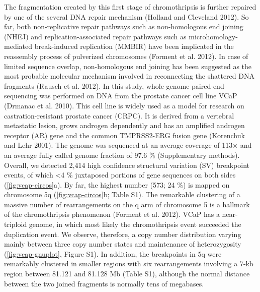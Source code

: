 The fragmentation created by this first stage of chromothripsis is further repaired by one of the several DNA repair mechanism (Holland and Cleveland 2012). So far, both non-replicative repair pathways such as non-homologous end joining (NHEJ) and replication-associated repair pathways such as microhomology-mediated break-induced replication (MMBIR) have been implicated in the reassembly process of pulverized chromosomes (Forment et al. 2012). In case of limited sequence overlap, non-homologous end joining has been suggested as the most probable molecular mechanism involved in reconnecting the shattered DNA fragments (Rausch et al. 2012).
In this study, whole genome paired-end sequencing was performed on DNA from the prostate cancer cell line VCaP (Drmanac et al. 2010). This cell line is widely used as a model for research on castration-resistant prostate cancer (CRPC). It is derived from a vertebral metastatic lesion, grows androgen dependently and has an amplified androgen receptor (AR) gene and the common TMPRSS2-ERG fusion gene (Korenchuk and Lehr 2001). The genome was sequenced at an average coverage of 113× and an average fully called genome fraction of 97.6 \% (Supplementary methods). Overall, we detected 2,414 high confidence structural variation (SV) breakpoint events, of which <4 \% juxtaposed portions of gene sequences on both sides (\ref{fig:vcap-circos}a). By far, the highest number (573; 24 \%) is mapped on chromosome 5q (\ref{fig:vcap-circos}b; Table S1). The remarkable clustering of a massive number of rearrangements on the q arm of chromosome 5 is a hallmark of the chromothripsis phenomenon (Forment et al. 2012). VCaP has a near-triploid genome, in which most likely the chromothripsis event succeeded the duplication event. We observe, therefore, a copy number distribution varying mainly between three copy number states and maintenance of heterozygosity (\ref{fig:vcap-gnuplot}, Figure S1). In addition, the breakpoints in 5q were remarkably clustered in smaller regions with six rearrangements involving a 7-kb region between 81.121 and 81.128 Mb (Table S1), although the normal distance between the two joined fragments is normally tens of megabases.

